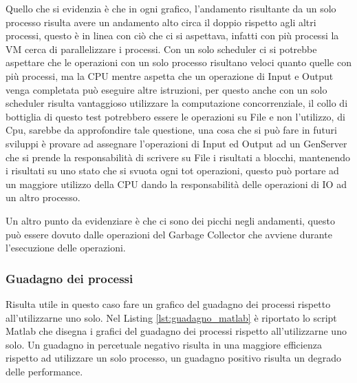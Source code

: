 Quello che si evidenzia è che in ogni grafico, l'andamento
risultante da un solo processo risulta avere un andamento alto circa il
doppio rispetto agli altri processi, questo è in linea con ciò che
ci si aspettava, infatti con più processi la VM cerca di parallelizzare
i processi. Con un solo scheduler ci si potrebbe aspettare che
le operazioni con un solo processo risultano veloci quanto
quelle con più processi, ma la CPU mentre aspetta
che un operazione di Input e Output venga completata
può eseguire altre istruzioni,
per questo anche con un solo scheduler risulta vantaggioso
utilizzare la computazione concorrenziale, il collo di bottiglia
di questo test potrebbero essere le operazioni su File e non l'utilizzo,
di Cpu, sarebbe da approfondire
tale questione, una cosa che si può fare in futuri sviluppi è 
provare ad assegnare l'operazioni di Input ed Output ad un GenServer
che si prende la responsabilità di scrivere su File i risultati
a blocchi, mantenendo i risultati su uno stato che si svuota ogni
tot operazioni, questo può portare ad un maggiore utilizzo della CPU
dando la responsabilità delle operazioni di IO ad un altro processo.

Un altro punto da evidenziare è che ci sono dei picchi negli
andamenti, questo può essere dovuto dalle operazioni
del Garbage Collector che avviene durante l'esecuzione
delle operazioni.

\subsubsection{Guadagno dei processi}

Risulta utile in questo caso fare un grafico del guadagno dei
processi rispetto all'utilizzarne uno solo. Nel Listing \ref{lst:guadagno_matlab}
è riportato lo script Matlab che disegna i grafici del guadagno
dei processi rispetto all'utilizzarne uno solo.
Un guadagno in percetuale negativo risulta in una maggiore efficienza
rispetto ad utilizzare un solo processo, un guadagno positivo
risulta un degrado delle performance.

